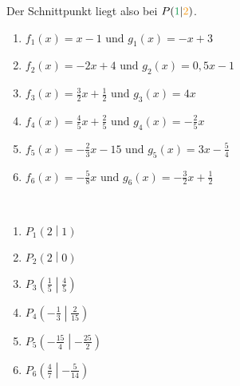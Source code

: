 Der Schnittpunkt liegt also bei \(P\left(\textcolor{ForestGreen}{1}\middle\vert\textcolor{YellowOrange}{2}\right)\).
\begin{Exercise}[title={Bestimme jeweils den Schnittpunkt}, label=schnittpunktA1]

	\begin{minipage}{0.5\textwidth}
		\begin{enumerate}[label=\alph*)]
			\item \(f_1(x)=x-1\text{ und }g_1(x)=-x+3\)
			\item \(f_2(x)=-2x+4\text{ und }g_2(x)=0,5x-1\)
			\item \(f_3(x)=\frac{3}{2}x+\frac{1}{2}\text{ und }g_3(x)=4x\)
		\end{enumerate}
	\end{minipage}%
	\begin{minipage}{0.5\textwidth}
		\begin{enumerate}[label=\alph*)]
			\setcounter{enumi}{3}
			\item \(f_4(x)=\frac{4}{5}x+\frac{2}{5}\text{ und }g_4(x)=-\frac{2}{5}x\)
			\item \(f_5(x)=-\frac{2}{3}x-15\text{ und }g_5(x)=3x-\frac{5}{4}\)
			\item \(f_6(x)=-\frac{5}{8}x\text{ und }g_6(x)=-\frac{3}{2}x+\frac{1}{2}\)
		\end{enumerate}
	\end{minipage}%
\end{Exercise}\vspace{.5cm}
\begin{Answer}[ref=schnittpunktA1]\\
	\begin{minipage}{0.5\textwidth}
		\begin{enumerate}[label=\alph*)]
			\item \(P_1\left(2\middle\vert 1\right)\)
			\item \(P_2\left(2\middle\vert 0\right)\)
			\item \(P_3\left(\frac{1}{5}\middle\vert \frac{4}{5}\right)\)
		\end{enumerate}
	\end{minipage}%
	\begin{minipage}{0.5\textwidth}
		\begin{enumerate}[label=\alph*)]
			\setcounter{enumi}{3}
			\item \(P_4\left(-\frac{1}{3}\middle\vert \frac{2}{15}\right)\)
			\item \(P_5\left(-\frac{15}{4}\middle\vert -\frac{25}{2}\right)\)
			\item \(P_6\left(\frac{4}{7}\middle\vert -\frac{5}{14}\right)\)
		\end{enumerate}
	\end{minipage}%
\end{Answer}